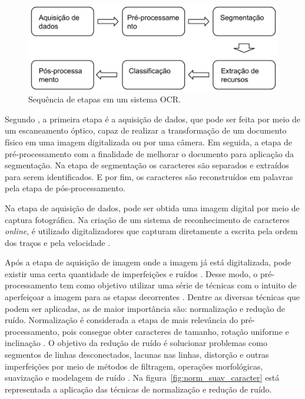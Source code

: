  \begin{figure}[h]
	\centering
	\includegraphics[width=1.0\textwidth]{Imagens/etapasocr} 
	\caption[Sequência de etapas em um sistema OCR.]{Sequência de etapas em um sistema OCR.}
	\label{fig:etapasocr}
\end{figure}

Segundo , a primeira etapa é a aquisição de dados, que pode ser feita por meio de um escaneamento óptico, capaz de realizar a transformação de um documento físico em uma imagem digitalizada ou por uma câmera. Em seguida, a etapa de pré-processamento com a finalidade de melhorar o documento para aplicação da segmentação. Na etapa de segmentação os caracteres são separados e extraídos para serem identificados. E por fim, os caracteres são reconstruídos em palavras pela etapa de pós-processamento.

Na etapa de aquisição de dados, pode ser obtida uma imagem digital por meio de captura fotográfica. Na criação de um sistema de reconhecimento de caracteres \textit{online}, é utilizado digitalizadores que capturam diretamente a escrita pela ordem dos traços e pela velocidade \cite{Goswami2013}.

Após a etapa de aquisição de imagem onde a imagem já está digitalizada, pode existir uma certa quantidade de imperfeições e ruídos \cite{Eikvil1993}. Desse modo, o pré-processamento tem como objetivo utilizar uma série de técnicas com o intuito de aperfeiçoar a imagem para as etapas decorrentes \cite{Goswami2013}. Dentre as diversas técnicas que podem ser aplicadas, as de maior importância são: normalização e redução de ruído. Normalização é considerada a etapa de mais relevância do pré-processamento, pois consegue obter caracteres de tamanho, rotação uniforme e inclinação \cite{Eikvil1993}. O objetivo da redução de ruído é solucionar problemas como segmentos de linhas desconectados, lacunas nas linhas, distorção e outras imperfeições por meio de métodos de filtragem, operações morfológicas, suavização e modelagem de ruído \cite{Goswami2013}. 
Na figura~\ref{fig:norm_suav_caracter} está representada a aplicação das técnicas de normalização e redução de ruído.

